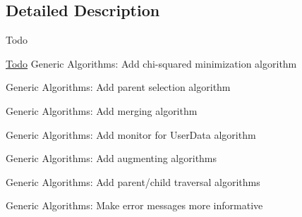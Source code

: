 \subsection{Detailed Description}
\begin{DoxyRefDesc}{Todo}
\item[\hyperlink{todo__todo000001}{Todo}]Generic Algorithms\-: Add chi-\/squared minimization algorithm 

Generic Algorithms\-: Add parent selection algorithm 

Generic Algorithms\-: Add merging algorithm 

Generic Algorithms\-: Add monitor for User\-Data algorithm 

Generic Algorithms\-: Add augmenting algorithms 

Generic Algorithms\-: Add parent/child traversal algorithms 

Generic Algorithms\-: Make error messages more informative \end{DoxyRefDesc}


